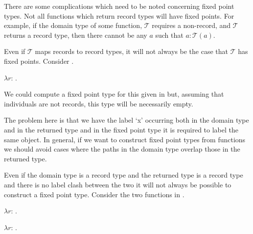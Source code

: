 \begin{shaded}\label{pg:fixedpointtype-discussion}
  There are some complications which need to be noted concerning fixed
  point types.  Not all functions which return record types
  will have fixed points.  For example, if the domain type of some
  function, $\mathcal{T}$ requires a non-record, and $\mathcal{T}$
  returns a record type, then there cannot be any $a$ such that
  $a:\mathcal{T}(a)$.

  Even if $\mathcal{T}$ maps records to record types, it will not
  always be the case that $\mathcal{T}$ has fixed points.  Consider
  \nexteg{}.
  \begin{ex}
    $\lambda r$: . 
    
  \end{ex} 
We could compute a fixed point type for this given in \nexteg{} but,
assuming that individuals are not records, this type will be
necessarily empty.
\begin{ex} 
\end{ex} 
The problem here is that we have the label `x' occurring both in the
domain type and in the returned type and in the fixed point type it is
required to label the same object.  In general, if we want to
construct fixed point types from functions we should avoid cases where
the paths in the domain type overlap those in the returned type.

Even if the domain type is a record type and the returned type is a
record type and there is no label clash between the two it will not
always be possible to construct a fixed point type.  Consider the two
functions in \nexteg{}.
\begin{ex} 
\begin{subex} 
 
\item $\lambda r$: . 
 
\item $\lambda r$: .  
 

\end{subex}
\end{ex}
\end{shaded}
